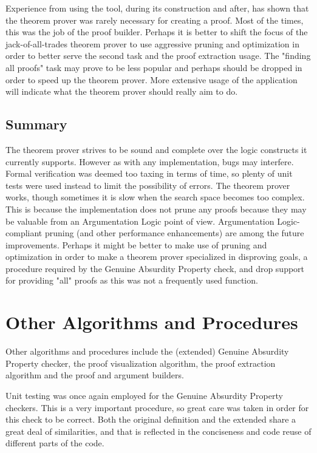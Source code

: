 \documentclass[11pt,twoside,a4paper]{report}
\begin{document}
Experience from using the tool, during its construction and after, has shown that the theorem prover was rarely necessary for creating a proof. Most of the times, this was the job of the proof builder. Perhaps it is better to shift the focus of the jack-of-all-trades theorem prover to use aggressive pruning and optimization in order to better serve the second task and the proof extraction usage. The "finding all proofs" task may prove to be less popular and perhaps should be dropped in order to speed up the theorem prover. More extensive usage of the application will indicate what the theorem prover should really aim to do.

\subsection{Summary}
The theorem prover strives to be sound and complete over the logic constructs it currently supports. However as with any implementation, bugs may interfere. Formal verification was deemed too taxing in terms of time, so plenty of unit tests were used instead to limit the possibility of errors. The theorem prover works, though sometimes it is slow when the search space becomes too complex. This is because the implementation does not prune any proofs because they may be valuable from an Argumentation Logic point of view. Argumentation Logic-compliant pruning (and other performance enhancements) are among the future improvements. Perhaps it might be better to make use of pruning and optimization in order to make a theorem prover specialized in disproving goals, a procedure required by the Genuine Absurdity Property check, and drop support for providing "all" proofs as this was not a frequently used function.

\section{Other Algorithms and Procedures}
Other algorithms and procedures include the (extended) Genuine Absurdity Property checker, the proof visualization algorithm, the proof extraction algorithm and the proof and argument builders.

Unit testing was once again employed for the Genuine Absurdity Property checkers. This is a very important procedure, so great care was taken in order for this check to be correct. Both the original definition and the extended share a great deal of similarities, and that is reflected in the conciseness and code reuse of different parts of the code.
\end{document}
